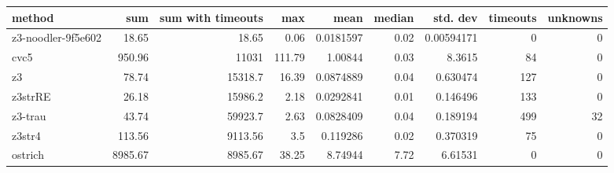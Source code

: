 \begin{tabular}{lrrrrrrrr}
\hline
 method             &     sum &   sum with timeouts &    max &      mean &   median &   std. dev &   timeouts &   unknowns \\
\hline
 z3-noodler-9f5e602 &   18.65 &               18.65 &   0.06 & 0.0181597 &     0.02 & 0.00594171 &          0 &          0 \\
 cvc5               &  950.96 &            11031    & 111.79 & 1.00844   &     0.03 & 8.3615     &         84 &          0 \\
 z3                 &   78.74 &            15318.7  &  16.39 & 0.0874889 &     0.04 & 0.630474   &        127 &          0 \\
 z3strRE            &   26.18 &            15986.2  &   2.18 & 0.0292841 &     0.01 & 0.146496   &        133 &          0 \\
 z3-trau            &   43.74 &            59923.7  &   2.63 & 0.0828409 &     0.04 & 0.189194   &        499 &         32 \\
 z3str4             &  113.56 &             9113.56 &   3.5  & 0.119286  &     0.02 & 0.370319   &         75 &          0 \\
 ostrich            & 8985.67 &             8985.67 &  38.25 & 8.74944   &     7.72 & 6.61531    &          0 &          0 \\
\hline
\end{tabular}
